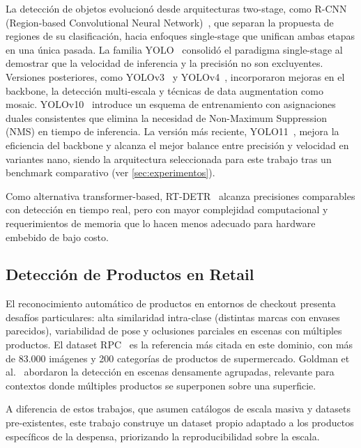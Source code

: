 \documentclass[conference,a4paper]{IEEEtran}[2015/08/26]
\begin{document}
La detección de objetos evolucionó desde arquitecturas two-stage, como R-CNN (Region-based Convolutional Neural Network)~\cite{girshick2014rcnn}, que separan la propuesta de regiones de su clasificación, hacia enfoques single-stage que unifican ambas etapas en una única pasada. La familia YOLO~\cite{redmon2016yolo} consolidó el paradigma single-stage al demostrar que la velocidad de inferencia y la precisión no son excluyentes. Versiones posteriores, como YOLOv3~\cite{redmon2018yolov3} y YOLOv4~\cite{bochkovskiy2020yolov4}, incorporaron mejoras en el backbone, la detección multi-escala y técnicas de data augmentation como mosaic. YOLOv10~\cite{wang2024yolov10} introduce un esquema de entrenamiento con asignaciones duales consistentes que elimina la necesidad de Non-Maximum Suppression (NMS) en tiempo de inferencia. La versión más reciente, YOLO11~\cite{jocher2023ultralytics}, mejora la eficiencia del backbone y alcanza el mejor balance entre precisión y velocidad en variantes nano, siendo la arquitectura seleccionada para este trabajo tras un benchmark comparativo (ver \cref{sec:experimentos}).

Como alternativa transformer-based, RT-DETR~\cite{zhao2023rtdetr} alcanza precisiones comparables con detección en tiempo real, pero con mayor complejidad computacional y requerimientos de memoria que lo hacen menos adecuado para hardware embebido de bajo costo.

\subsection{Detección de Productos en Retail}

El reconocimiento automático de productos en entornos de checkout presenta desafíos particulares: alta similaridad intra-clase (distintas marcas con envases parecidos), variabilidad de pose y oclusiones parciales en escenas con múltiples productos. El dataset RPC~\cite{wei2019rpc} es la referencia más citada en este dominio, con más de 83.000 imágenes y 200 categorías de productos de supermercado. Goldman et al.~\cite{goldman2019precise} abordaron la detección en escenas densamente agrupadas, relevante para contextos donde múltiples productos se superponen sobre una superficie.

A diferencia de estos trabajos, que asumen catálogos de escala masiva y datasets pre-existentes, este trabajo construye un dataset propio adaptado a los productos específicos de la despensa, priorizando la reproducibilidad sobre la escala.
\end{document}
